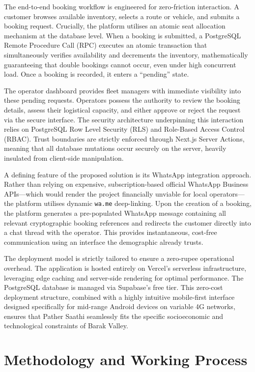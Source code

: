 \documentclass[12pt,a4paper]{report}
\begin{document}
The end-to-end booking workflow is engineered for zero-friction interaction. A customer browses available inventory, selects a route or vehicle, and submits a booking request. Crucially, the platform utilises an atomic seat allocation mechanism at the database level. When a booking is submitted, a PostgreSQL Remote Procedure Call (RPC) executes an atomic transaction that simultaneously verifies availability and decrements the inventory, mathematically guaranteeing that double bookings cannot occur, even under high concurrent load. Once a booking is recorded, it enters a ``pending'' state. 

The operator dashboard provides fleet managers with immediate visibility into these pending requests. Operators possess the authority to review the booking details, assess their logistical capacity, and either approve or reject the request via the secure interface. The security architecture underpinning this interaction relies on PostgreSQL Row Level Security (RLS) and Role-Based Access Control (RBAC). Trust boundaries are strictly enforced through Next.js Server Actions, meaning that all database mutations occur securely on the server, heavily insulated from client-side manipulation. 

A defining feature of the proposed solution is its WhatsApp integration approach. Rather than relying on expensive, subscription-based official WhatsApp Business APIs---which would render the project financially unviable for local operators---the platform utilises dynamic \texttt{wa.me} deep-linking. Upon the creation of a booking, the platform generates a pre-populated WhatsApp message containing all relevant cryptographic booking references and redirects the customer directly into a chat thread with the operator. This provides instantaneous, cost-free communication using an interface the demographic already trusts. 

The deployment model is strictly tailored to ensure a zero-rupee operational overhead. The application is hosted entirely on Vercel's serverless infrastructure, leveraging edge caching and server-side rendering for optimal performance. The PostgreSQL database is managed via Supabase's free tier. This zero-cost deployment structure, combined with a highly intuitive mobile-first interface designed specifically for mid-range Android devices on variable 4G networks, ensures that Pather Saathi seamlessly fits the specific socioeconomic and technological constraints of Barak Valley.

\chapter{Methodology and Working Process}
\end{document}
